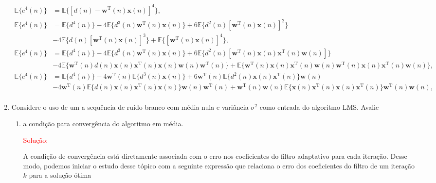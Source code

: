 \documentclass[a4paper,10pt]{article}
\begin{document}
\begin{enumerate}
				\begin{align*}
					\mathbb{E}\{e^{4}(n)\} &= \mathbb{E}\{\left[d(n) - \mathbf{w}^{\text{T}}(n)\mathbf{x}(n)\right]^{4}\}, \\
					\mathbb{E}\{e^{4}(n)\} &= \mathbb{E}\{d^{4}(n)\} - 4\mathbb{E}\{d^{3}(n)\mathbf{w}^{\text{T}}(n)\mathbf{x}(n)\} + 6\mathbb{E}\{d^{2}(n)\left[\mathbf{w}^{\text{T}}(n)\mathbf{x}(n)\right]^{2}\} \\
					&-4\mathbb{E}\{d(n)\left[\mathbf{w}^{\text{T}}(n)\mathbf{x}(n)\right]^{3}\} + \mathbb{E}\{\left[\mathbf{w}^{\text{T}}(n)\mathbf{x}(n)\right]^{4}\}, \\
					\mathbb{E}\{e^{4}(n)\} &= \mathbb{E}\{d^{4}(n)\} - 4\mathbb{E}\{d^{3}(n)\mathbf{w}^{\text{T}}(n)\mathbf{x}(n)\} + 6\mathbb{E}\{d^{2}(n)\left[\mathbf{w}^{\text{T}}(n)\mathbf{x}(n) \mathbf{x}^{\text{T}}(n)\mathbf{w}(n)\right]\} \\&
					-4 \mathbb{E}\{\mathbf{w}^{\text{T}}(n) d(n) \mathbf{x}(n) \mathbf{x}^{\text{T}}(n) \mathbf{x}(n) \mathbf{w}(n) \mathbf{w}^{\text{T}}(n) \} + \mathbb{E}\{\mathbf{w}^{\text{T}}(n)\mathbf{x}(n) \mathbf{x}^{\text{T}}(n) \mathbf{w}(n) \mathbf{w}^{\text{T}}(n)\mathbf{x}(n) \mathbf{x}^{\text{T}}(n)\mathbf{w}(n)\}, \\
					\mathbb{E}\{e^{4}(n)\} &= \mathbb{E}\{d^{4}(n)\} - 4 \mathbf{w}^{\text{T}}(n)\mathbb{E}\{d^{3}(n)\mathbf{x}(n)\} + 6 \mathbf{w}^{\text{T}}(n) \mathbb{E}\{d^{2}(n)\mathbf{x}(n) \mathbf{x}^{\text{T}}(n)\} \mathbf{w}(n) \\
					&- 4\mathbf{w}^{\text{T}}(n) \mathbb{E}\{d(n) \mathbf{x}(n) \mathbf{x}^{\text{T}}(n) \mathbf{x}(n)\} \mathbf{w}(n) \mathbf{w}^{\text{T}}(n) + \mathbf{w}^{\text{T}}(n) \mathbf{w}(n) \mathbb{E}\{\mathbf{x}(n) \mathbf{x}^{\text{T}}(n) \mathbf{x}(n) \mathbf{x}^{\text{T}}(n)\} \mathbf{w}^{\text{T}}(n) \mathbf{w}(n), \\
				\end{align*}
			
			\item Considere o uso de um a sequência de ruído branco com média nula e variância $\sigma^{2}$ como entrada do algoritmo LMS. Avalie
				
				\begin{enumerate}
					
					\item a condição para convergência do algoritmo em média.
					
						\textcolor{red}{Solução:}
						
						A condição de convergência está diretamente associada com o erro nos coeficientes do filtro adaptativo para cada iteração.
						Desse modo, podemos iniciar o estudo desse tópico com a seguinte expressão que relaciona o erro dos coeficientes do filtro de um iteração
						$k$ para a solução ótima
						

\end{enumerate}
\end{enumerate}
\end{document}

